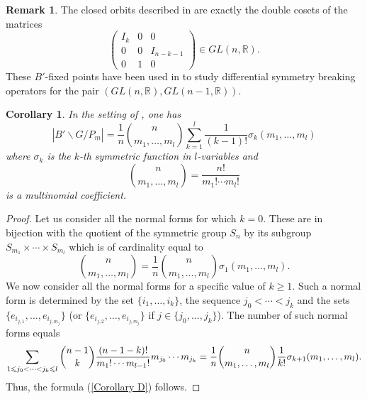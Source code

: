 \documentclass[pdftex]{sigma}
\numberwithin{equation}{section}
\theoremstyle{definition}
\newtheorem{Remark}[Theorem]{Remark}
\newcommand{\R}{\mathbb{R}}
\theoremstyle{plain}
\theoremstyle{plain}
\theoremstyle{plain}
\theoremstyle{plain}
\newtheorem{corollaryx}[theoremx]{Corollary}
\begin{document}
\begin{Remark}
	The closed orbits described in  are exactly the double cosets of the matrices
	\begin{equation*}
		\begin{pmatrix}
		I_k & 0 & 0 \\
		0 & 0 & I_{n-k-1} \\
		0 & 1 & 0
	\end{pmatrix} \in GL(n,\R).
	\end{equation*}
	These $B'$-fixed points have been used in \cite{DitlevsenLabriet} to study differential symmetry breaking operators for the pair $(GL(n,\R),GL(n-1,\R))$.
\end{Remark}

\begin{corollaryx}
	In the setting of , one has
	\begin{equation}\label{Corollary D}
		\left|B'\backslash G/P_{\underline m}\right| = \frac{1}{n}\binom{n}{m_1,\dots,m_l}\sum_{k=1}^{l}\frac{1}{(k-1)!}\sigma_k(m_1,\dots,m_l)
	\end{equation}
	where $\sigma_k$ is the $k$-th symmetric function in $l$-variables and 
	\begin{equation*}
		\binom{n}{m_1,\dots,m_l} = \frac{n!}{m_1!\cdots m_l!}
	\end{equation*}
	is a multinomial coefficient.
\end{corollaryx}
\begin{proof}
	Let us consider all the normal forms for which $k = 0$. These are in bijection with the quotient of the symmetric group $S_n$ by its subgroup $S_{m_1}\times \cdots \times S_{m_l}$ which is of cardinality equal to
	\begin{equation*}
		\binom{n}{m_1,\dots,m_l} = \frac{1}{n}\binom{n}{m_1,\dots,m_l}\sigma_1(m_1,\dots,m_l).
	\end{equation*}
	We now consider all the normal forms for a specific value of $k \geqslant 1$. Such a normal form is determined by the set $\{i_1,\dots,i_{k}\}$, the sequence $j_0 < \cdots < j_k$ and the sets $\{e_{i_{j,1}},\dots,e_{i_{j,m_j}}\}$ (or $\{e_{i_{j,2}},\dots,e_{i_{j,m_j}}\}$ if $j \in \{j_0,\dots,j_k\}$). The number of such normal forms equals
	\begin{equation*}
		\sum_{1 \leqslant j_0 < \cdots < j_k \leqslant l} \binom{n-1}{k}\frac{(n-1-k)!}{m_1!\cdots m_{l-1}!}m_{j_0}\cdots m_{j_k} \\ 
		= \frac{1}{n} \binom{n}{m_1,\dots,m_l} \frac{1}{k!}\sigma_{k+1}(m_1,\dots,m_l).
	\end{equation*}
	Thus, the formula (\ref{Corollary D}) follows.
\end{proof}
\end{document}
